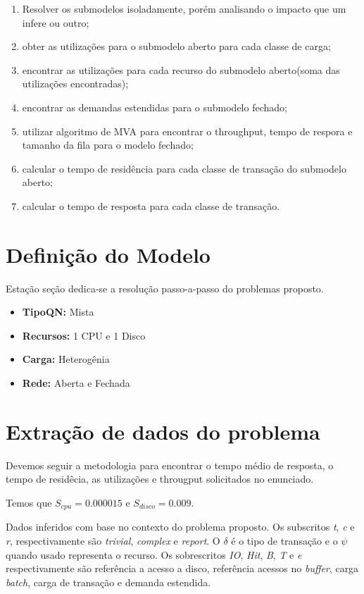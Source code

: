 \documentclass[11pt,a4paper]{abntex2}
\begin{document}
	
	\begin{enumerate}
	\item  Resolver os submodelos isoladamente, porém analisando o impacto que um infere ou outro;
	\item  obter as utilizações para o submodelo aberto para cada classe de carga;
	\item encontrar as utilizações para cada recurso do submodelo aberto(soma das utilizações encontradas);
	\item encontrar as demandas estendidas para o submodelo fechado;
	\item utilizar algoritmo de MVA para encontrar o throughput, tempo de respora e tamanho da fila para o modelo fechado;
	\item calcular o tempo de residência para cada classe de transação do submodelo aberto;
	\item calcular o tempo de resposta para cada classe de transação.  
	\end{enumerate}
	

\section*{\textbf{Definição do Modelo} }

Estação seção dedica-se a resolução passo-a-passo do problemas proposto.
		\begin{itemize}
			\item \textbf{TipoQN:} Mista
			\item \textbf{Recursos:} 1 CPU e 1 Disco
			\item \textbf{Carga:} Heterogênia
			\item \textbf{Rede:} Aberta e Fechada
		\end{itemize}
	
	
	
		
\section*{\textbf{Extração de dados do problema}}	

Devemos seguir a metodologia para encontrar o tempo médio de resposta, o tempo de residêcia, as utilizações e througput solicitados no enunciado.

Temos que $S_{cpu}=0.000015$ e $S_{disco}=0.009$.



Dados inferidos com base no contexto do problema proposto. Os subscritos \textit{t}, \textit{c} e \textit{r}, respectivamente são \textit{trivial}, \textit{complex} e \textit{report}. O $\delta$ é o tipo de transação e o $\psi$ quando usado representa o recurso. Os sobrescritos \textit{IO}, \textit{Hit}, \textit{B}, \textit{T} e \textit{e} respectivamente são referência a acesso a disco, referência acessos no \textit{buffer}, carga \textit{batch}, carga de transação e demanda estendida.
\end{document}
